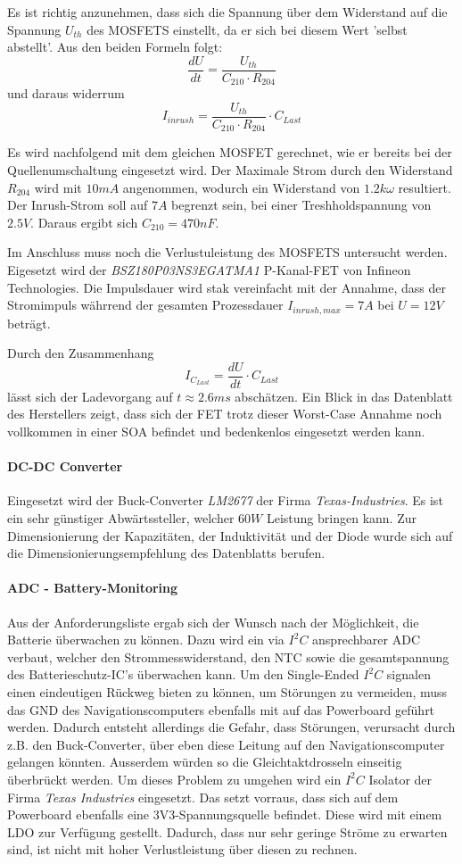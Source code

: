 \documentclass[main.tex]{subfiles} %
\begin{document}
Es ist richtig anzunehmen, dass sich die Spannung über dem Widerstand auf die
Spannung $U_{th}$ des MOSFETS einstellt, da er sich bei diesem Wert 'selbst
abstellt'. Aus den beiden Formeln folgt:
\[
    \frac{dU}{dt} = \frac{U_{th}}{C_{210} \cdot R_{204}}
\]
und daraus widerrum
\[
    I_{inrush} = \frac{U_{th}}{C_{210} \cdot R_{204}} \cdot C_{Last}
\]

Es wird nachfolgend mit dem gleichen MOSFET gerechnet, wie er bereits bei der
Quellenumschaltung eingesetzt wird. Der Maximale Strom durch den Widerstand
$R_{204}$ wird mit $10mA$ angenommen, wodurch ein Widerstand von $1.2k \omega$
resultiert. Der Inrush-Strom soll auf $7A$ begrenzt sein, bei einer
Treshholdspannung von $2.5V$. Daraus ergibt sich $C_{210} = 470nF$.

Im Anschluss muss noch die Verlustuleistung des MOSFETS untersucht werden.
Eigesetzt wird der \textit{BSZ180P03NS3EGATMA1} P-Kanal-FET von Infineon
Technologies. Die Impulsdauer wird stak vereinfacht mit der Annahme, dass der
Stromimpuls währrend der gesamten Prozessdauer $I_{inrush, max} = 7A$ bei $U =
    12V$ beträgt.

Durch den Zusammenhang
\[
    I_{C_{Last}}  = \frac{dU}{dt} \cdot C_{Last}
\]
lässt sich der Ladevorgang auf $t \approx 2.6ms$ abschätzen. Ein Blick in das
Datenblatt des Herstellers zeigt, dass sich der FET trotz dieser Worst-Case
Annahme noch vollkommen in einer SOA befindet und bedenkenlos eingesetzt werden
kann.

\paragraph{DC-DC Converter}
Eingesetzt wird der Buck-Converter \textit{LM2677} der Firma
\textit{Texas-Industries}. Es ist ein sehr günstiger Abwärtssteller, welcher
$60W$ Leistung bringen kann. Zur Dimensionierung der Kapazitäten, der
Induktivität und der Diode wurde sich auf die Dimensionierungsempfehlung des
Datenblatts berufen.

\paragraph{ADC - Battery-Monitoring}
Aus der Anforderungsliste ergab sich der Wunsch nach der Möglichkeit, die
Batterie überwachen zu können. Dazu wird ein via $I^2C$ ansprechbarer ADC
verbaut, welcher den Strommesswiderstand, den NTC sowie die gesamtspannung des
Batterieschutz-IC's überwachen kann. Um den Single-Ended $I^2C$ signalen einen
eindeutigen Rückweg bieten zu können, um Störungen zu vermeiden, muss das GND
des Navigationscomputers ebenfalls mit auf das Powerboard geführt werden.
Dadurch entsteht allerdings die Gefahr, dass Störungen, verursacht durch z.B.
den Buck-Converter, über eben diese Leitung auf den Navigationscomputer
gelangen könnten. Ausserdem würden so die Gleichtaktdrosseln einseitig
überbrückt werden. Um dieses Problem zu umgehen wird ein $I^2C$ Isolator der
Firma \textit{Texas Industries} eingesetzt. Das setzt vorraus, dass sich auf
dem Powerboard ebenfalls eine 3V3-Spannungsquelle befindet. Diese wird mit
einem LDO zur Verfügung gestellt. Dadurch, dass nur sehr geringe Ströme zu
erwarten sind, ist nicht mit hoher Verlustleistung über diesen zu rechnen.
\end{document}
